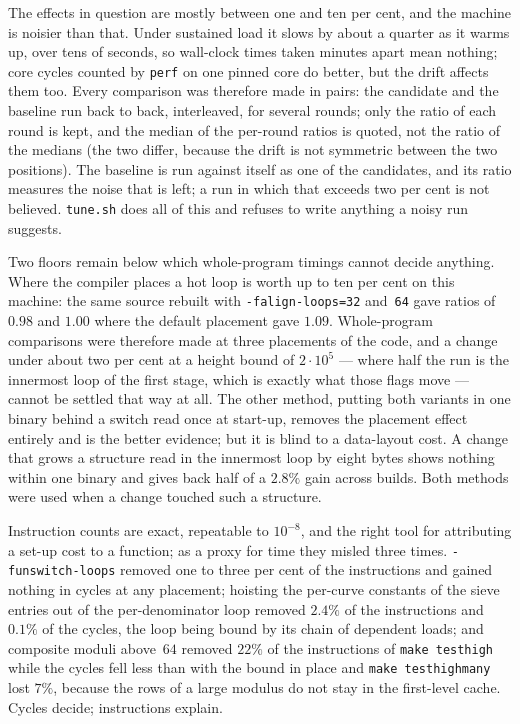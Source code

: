 \documentclass[12pt,a4paper,oneside]{amsart}
\begin{document}
The effects in question are mostly between one and ten per cent, and the
machine is noisier than that. Under sustained load it slows by about a
quarter as it warms up, over tens of seconds, so wall-clock times taken
minutes apart mean nothing; core cycles counted by \texttt{perf} on one
pinned core do better, but the drift affects them too. Every comparison was
therefore made in pairs: the candidate and the baseline run back to back,
interleaved, for several rounds; only the ratio of each round is kept, and
the median of the per-round ratios is quoted, not the ratio of the medians
(the two differ, because the drift is not symmetric between the two
positions). The baseline is run against itself as one of the candidates,
and its ratio measures the noise that is left; a run in which that exceeds
two per cent is not believed. \texttt{tune.sh} does all of this and refuses
to write anything a noisy run suggests.

Two floors remain below which whole-program timings cannot decide anything.
Where the compiler places a hot loop is worth up to ten per cent on this
machine: the same source rebuilt with \texttt{-falign-loops=32} and~\texttt{64}
gave ratios of $0.98$ and $1.00$ where the default placement gave $1.09$.
Whole-program comparisons were therefore made at three placements of the
code, and a change under about two per cent at a height bound of
$2\cdot10^5$ --- where half the run is the innermost loop of the first stage,
which is exactly what those flags move --- cannot be settled that way at
all. The other method, putting both variants in one binary behind a switch
read once at start-up, removes the placement effect entirely and is the
better evidence; but it is blind to a data-layout cost. A change that grows
a structure read in the innermost loop by eight bytes shows nothing within
one binary and gives back half of a $2.8\%$ gain across builds. Both methods
were used when a change touched such a structure.

Instruction counts are exact, repeatable to $10^{-8}$, and the right tool for
attributing a set-up cost to a function; as a proxy for time they misled
three times. \texttt{-funswitch-loops} removed one to three per cent of the
instructions and gained nothing in cycles at any placement; hoisting the
per-curve constants of the sieve entries out of the per-denominator loop
removed $2.4\%$ of the instructions and $0.1\%$ of the cycles, the loop being
bound by its chain of dependent loads; and composite moduli above~$64$
removed $22\%$ of the instructions of \texttt{make testhigh} while the cycles
fell less than with the bound in place and \texttt{make testhighmany} lost
$7\%$, because the rows of a large modulus do not stay in the first-level
cache. Cycles decide; instructions explain.
\end{document}

